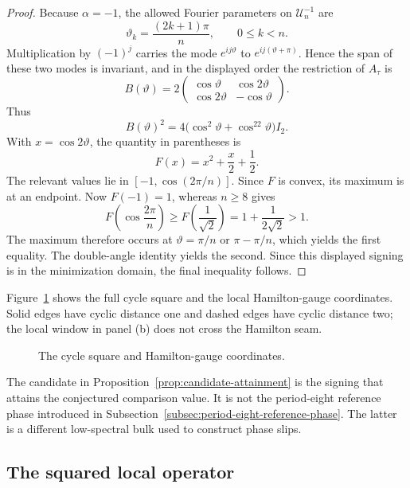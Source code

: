 \begin{proof}
Because \(\alpha=-1\), the allowed Fourier parameters on
\(\mathcal U_n^{-1}\) are
\[
\vartheta_k=\frac{(2k+1)\pi}{n},\qquad 0\leq k<n.
\]
Multiplication by \((-1)^j\) carries the mode \(e^{ij\vartheta}\) to
\(e^{ij(\vartheta+\pi)}\).  Hence the span of these two modes is invariant,
and in the displayed order the restriction of \(A_\tau\) is
\[
B(\vartheta)
=2\begin{pmatrix}
\cos\vartheta&\cos2\vartheta\\
\cos2\vartheta&-\cos\vartheta
\end{pmatrix}.
\]
Thus
\[
B(\vartheta)^2
=4\bigl(\cos^2\vartheta+\cos^22\vartheta\bigr)I_2.
\]
With \(x=\cos2\vartheta\), the quantity in parentheses is
\[
F(x)=x^2+\frac{x}{2}+\frac12.
\]
The relevant values lie in
\([-1,\cos(2\pi/n)]\).  Since \(F\) is convex, its maximum is at an endpoint.
Now \(F(-1)=1\), whereas \(n\geq8\) gives
\[
F\left(\cos\frac{2\pi}{n}\right)
\geq F\left(\frac1{\sqrt2}\right)
=1+\frac1{2\sqrt2}>1.
\]
The maximum therefore occurs at
\(\vartheta=\pi/n\) or \(\pi-\pi/n\), which yields the first equality.
The double-angle identity yields the second. Since this displayed signing is
in the minimization domain, the final inequality follows.
\end{proof}

Figure~\ref{fig:switching-coordinates} shows the full cycle square and the
local Hamilton-gauge coordinates. Solid edges have cyclic distance one and
dashed edges have cyclic distance two; the local window in panel (b) does
not cross the Hamilton seam.
\begin{figure}[t]
\centering

\caption{The cycle square and Hamilton-gauge coordinates.}
\label{fig:switching-coordinates}
\end{figure}

The candidate in Proposition~\ref{prop:candidate-attainment} is the signing
that attains the conjectured comparison value.  It is not the period-eight
reference phase introduced in Subsection~\ref{subsec:period-eight-reference-phase}.
The latter is a different low-spectral bulk used to construct phase slips.

\subsection{The squared local operator}
\label{subsec:squared-local-operator}


